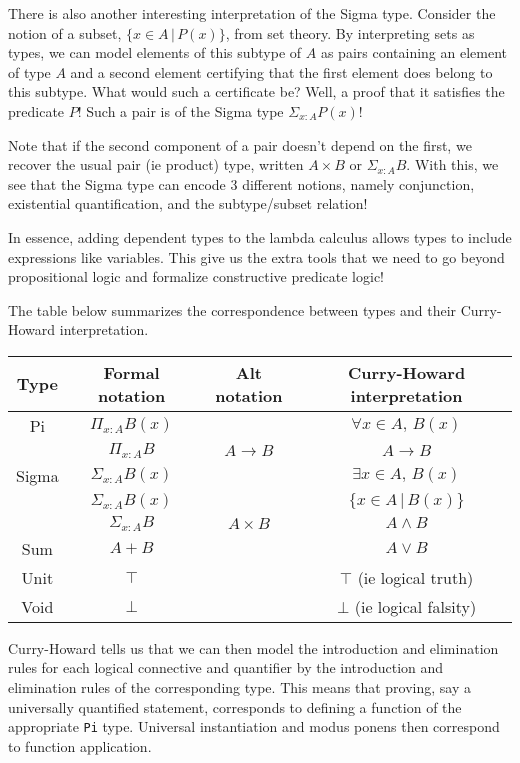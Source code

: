 \documentclass{article}
\begin{document}
There is also another interesting interpretation of the Sigma type.
Consider the notion of a subset, $\{x \in A \, | \, P(x) \}$, from set theory.
By interpreting sets as types, we can model elements of this subtype of $A$ as
pairs containing an element of type $A$ and a second element certifying that the
first element does belong to this subtype. What would such a certificate be?
Well, a proof that it satisfies the predicate $P$!
Such a pair is of the Sigma type $\Sigma_{x : A} P(x)$!

Note that if the second component of a pair doesn't depend on the first, we recover
the usual pair (ie product) type, written $A \times B$ or $\Sigma_{x : A} B$.
With this, we see that the Sigma type can encode 3 different notions, namely
conjunction, existential quantification, and the subtype/subset relation!

In essence, adding dependent types to the lambda calculus allows types to include
expressions like variables.
This give us the extra tools that we need to go beyond propositional logic and
formalize constructive predicate logic!

The table below summarizes the correspondence between types and their Curry-Howard
interpretation.

\begin{center}
\begin{tabular}{ |c|c|c|c| }
  \hline
 Type & Formal notation & Alt notation & Curry-Howard interpretation \\ 
 \hline
 Pi & $\Pi_{x : A}B(x)$ & & $\forall x \in A, \, B(x)$ \\  
    & $\Pi_{x : A}B$ & $A \rightarrow B$ & $A \rightarrow B$ \\  
    \hline
 Sigma & $\Sigma_{x : A}B(x)$ & & $\exists x \in A, \, B(x)$ \\
       & $\Sigma_{x : A}B(x)$ & & $\{ x \in A \, | \, B(x) \}$ \\
       & $\Sigma_{x : A}B$ & $A \times B$ & $A \wedge B$ \\
       \hline
 Sum & $A + B$ & & $A \vee B$ \\
 \hline
 Unit & $\top$ & & $\top$ (ie logical truth) \\
 \hline
 Void & $\bot$ & & $\bot$ (ie logical falsity) \\
 \hline
\end{tabular}
\end{center}

Curry-Howard tells us that we can then model the introduction and elimination
rules for each logical connective and quantifier by the introduction and elimination
rules of the corresponding type. This means that proving, say a universally
quantified statement, corresponds to defining a function of the appropriate
\verb|Pi| type. Universal instantiation and modus ponens then correspond to
function application.
\end{document}
